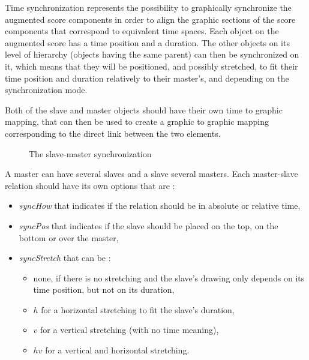 \documentclass[a4paper]{article}
\begin{document}
Time synchronization represents the possibility to graphically synchronize the augmented score components in order to align the graphic sections of the score components that correspond to equivalent time spaces. Each object on the augmented score has a time position and a duration. The other objects on its level of hierarchy (objects having the same parent) can then be synchronized on it, which means that they will be positioned, and possibly stretched, to fit their time position and duration relatively to their master's, and depending on the synchronization mode. 

Both of the slave and master objects should have their own time to graphic mapping, that can then be used to create a graphic to graphic mapping corresponding to the direct link between the two elements. 
\bigskip

\begin{figure}[h]
\begin{center}


 \caption{The slave-master synchronization}
 \label{fig:sync}

\end{center}
\end{figure}

A master can have several slaves and a slave several masters. Each master-slave relation should have its own options that are :
\begin{itemize}
  \item \emph{syncHow} that indicates if the relation should be in absolute or relative time,
  \item \emph{syncPos} that indicates if the slave should be placed on the top, on the bottom or over the master,
  \item \emph{syncStretch} that can be : \begin{itemize}
    \item none, if there is no stretching and the slave's drawing only depends on its time position, but not on its duration,
    \item $h$  for a horizontal stretching to fit the slave's duration,
    \item $v$ for a vertical stretching (with no time meaning),
    \item $hv$ for a vertical and horizontal stretching.
  \end{itemize}
\end{itemize}
\end{document}
